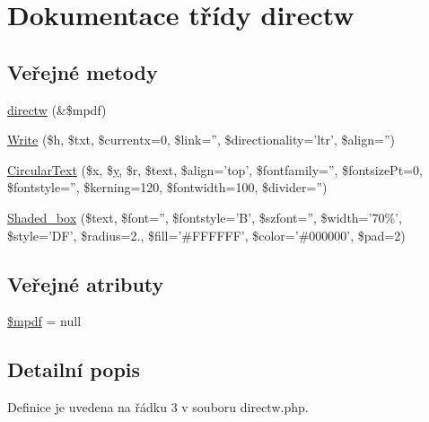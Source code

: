 \hypertarget{classdirectw}{\section{Dokumentace třídy directw}
\label{classdirectw}
}
\subsection*{Veřejné metody}
\begin{DoxyCompactItemize}
\item 
\hyperlink{classdirectw_af51ac4d6c6c4344d93bdff18d8c0e556}{directw} (\&\$mpdf)
\item 
\hyperlink{classdirectw_a7e730b8f2fb30a44c790b90a7ce3d4aa}{Write} (\$h, \$txt, \$currentx=0, \$link='', \$directionality='ltr', \$align='')
\item 
\hyperlink{classdirectw_a2215a36ab251eb5a68bcc2c188ea28f9}{Circular\-Text} (\$x, \$\hyperlink{example43___m_p_d_f_i__booklet_8php_a3f83be162d14f38451e1bc419fbbbcbc}{y}, \$r, \$text, \$align='top', \$fontfamily='', \$fontsize\-Pt=0, \$fontstyle='', \$kerning=120, \$fontwidth=100, \$divider='')
\item 
\hyperlink{classdirectw_a1184357fe4c1ceef893b9726b3347539}{Shaded\-\_\-box} (\$text, \$font='', \$fontstyle='B', \$szfont='', \$width='70\%', \$style='D\-F', \$radius=2., \$fill='\#F\-F\-F\-F\-F\-F', \$color='\#000000', \$pad=2)
\end{DoxyCompactItemize}
\subsection*{Veřejné atributy}
\begin{DoxyCompactItemize}
\item 
\hyperlink{classdirectw_a4b3fd8aff0032fa8a2e36999527ef445}{\$mpdf} = null
\end{DoxyCompactItemize}


\subsection{Detailní popis}


Definice je uvedena na řádku 3 v souboru directw.\-php.



